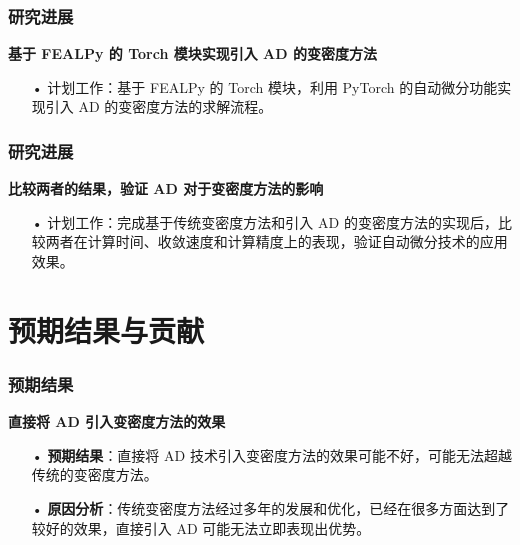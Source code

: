 \documentclass{beamer}
\numberwithin{subsection}{section}
\begin{document}
\begin{frame}
    \frametitle{研究进展}
    \textbf{基于 FEALPy 的 Torch 模块实现引入 AD 的变密度方法}
    \vspace{0.3cm}
    \begin{itemize}
        \item[•]计划工作：基于 FEALPy 的 Torch 模块，利用 PyTorch 的自动微分功能实现引入 AD 的变密度方法的求解流程。
    \end{itemize}
\end{frame}

\begin{frame}
    \frametitle{研究进展}
    \textbf{比较两者的结果，验证 AD 对于变密度方法的影响}
    \vspace{0.3cm}
    \begin{itemize}
        \item[•]计划工作：完成基于传统变密度方法和引入 AD 的变密度方法的实现后，比较两者在计算时间、收敛速度和计算精度上的表现，验证自动微分技术的应用效果。
    \end{itemize}
\end{frame}

\section{预期结果与贡献}

\begin{frame}
    \frametitle{预期结果}
    \textbf{直接将 AD 引入变密度方法的效果}
    \begin{itemize}
        \item[•]\textbf{预期结果}：直接将 AD 技术引入变密度方法的效果可能不好，可能无法超越传统的变密度方法。
        \vspace{0.3cm}
        \item[•]\textbf{原因分析}：传统变密度方法经过多年的发展和优化，已经在很多方面达到了较好的效果，直接引入 AD 可能无法立即表现出优势。
    \end{itemize}
\end{frame}
\end{document}
